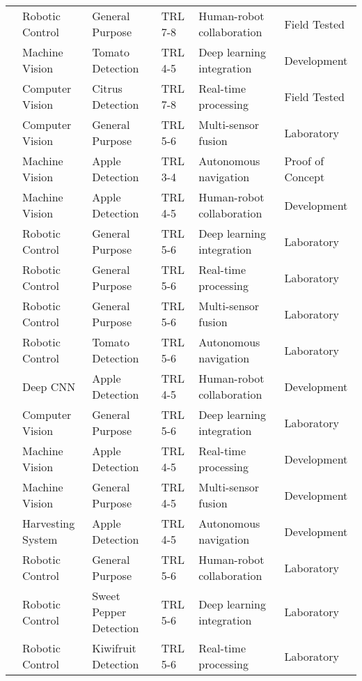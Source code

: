 \begin{table*}[htbp]
\begin{tabular}{@{}p{}p{}p{}p{}p{}p{}@{}}
\cite{robot2019} & Robotic Control & General Purpose & TRL 7-8 & Human-robot collaboration & Field Tested \\
\cite{harvest2017} & Machine Vision & Tomato Detection & TRL 4-5 & Deep learning integration & Development \\
\cite{vision2019} & Computer Vision & Citrus Detection & TRL 7-8 & Real-time processing & Field Tested \\
\cite{robot2022} & Computer Vision & General Purpose & TRL 5-6 & Multi-sensor fusion & Laboratory \\
\cite{apple2021} & Machine Vision & Apple Detection & TRL 3-4 & Autonomous navigation & Proof of Concept \\
\cite{apple2022} & Machine Vision & Apple Detection & TRL 4-5 & Human-robot collaboration & Development \\
\cite{robot2019} & Robotic Control & General Purpose & TRL 5-6 & Deep learning integration & Laboratory \\
\cite{robot2020} & Robotic Control & General Purpose & TRL 5-6 & Real-time processing & Laboratory \\
\cite{robot2021} & Robotic Control & General Purpose & TRL 5-6 & Multi-sensor fusion & Laboratory \\
\cite{robot2022} & Robotic Control & Tomato Detection & TRL 5-6 & Autonomous navigation & Laboratory \\
\cite{apple2022} & Deep CNN & Apple Detection & TRL 4-5 & Human-robot collaboration & Development \\
\cite{robot2018} & Computer Vision & General Purpose & TRL 5-6 & Deep learning integration & Laboratory \\
\cite{apple2019} & Machine Vision & Apple Detection & TRL 4-5 & Real-time processing & Development \\
\cite{harvest2022} & Machine Vision & General Purpose & TRL 4-5 & Multi-sensor fusion & Development \\
\cite{apple2021} & Harvesting System & Apple Detection & TRL 4-5 & Autonomous navigation & Development \\
\cite{robot2022} & Robotic Control & General Purpose & TRL 5-6 & Human-robot collaboration & Laboratory \\
\cite{robot2017} & Robotic Control & Sweet Pepper Detection & TRL 5-6 & Deep learning integration & Laboratory \\
\cite{robot2018} & Robotic Control & Kiwifruit Detection & TRL 5-6 & Real-time processing & Laboratory \\

\end{tabular}
\end{table*}
